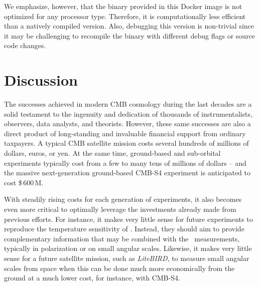 \documentclass[twocolumn]{openjournal}
\begin{document}
We emphasize, however, that the binary provided in this Docker image is not
optimized for any processor type. Therefore, it is computationally less
efficient than a natively compiled version. Also, debugging this version is
non-trivial since it may be challenging to recompile the binary with different
debug flags or source code changes.

\section{Discussion}
\label{sec:conclusions}

The successes achieved in modern CMB cosmology during the last decades are a
solid testament to the ingenuity and dedication of thousands of
instrumentalists, observers, data analysts, and theorists. However, these same
successes are also a direct product of long-standing and invaluable financial
support from ordinary taxpayers. A typical CMB satellite mission costs several
hundreds of millions of dollars, euros, or yen. At the same time, ground-based
and sub-orbital experiments typically cost from a few to many tens of millions
of dollars -- and the massive next-generation ground-based CMB-S4 experiment is
anticipated to cost \$\,600\,M.

With steadily rising costs for each generation of experiments, it also becomes
even more critical to optimally leverage the investments already made from
previous efforts. For instance, it makes very little sense for future
experiments to reproduce the temperature sensitivity of \Planck. Instead, they
should aim to provide complementary information that may be combined with the
\Planck\ measurements, typically in polarization or on small angular scales.
Likewise, it makes very little sense for a future satellite mission, such as
\textit{LiteBIRD}, to measure small angular scales from space when this can be
done much more economically from the ground at a much lower cost, for instance,
with CMB-S4.
\end{document}

